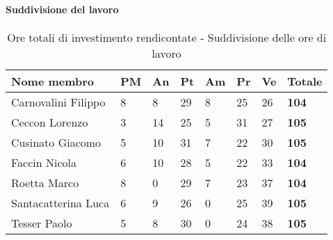 			\paragraph{Suddivisione del lavoro} %
			\label{par:suddivisione_del_lavoro}
				\begin{table}[!ht]
					\begin{center}
						\begin{tabularx}{0.9\textwidth}{|l|l|l|l|l|l|l|X|}
							\hline
							\textbf{Nome membro} & \textbf{PM} & \textbf{An} & \textbf{Pt} & \textbf{Am} & \textbf{Pr} & \textbf{Ve} & \textbf{Totale} \\
							\hline
							Carnovalini Filippo & 8 & 8 & 29 & 8 & 25 & 26 & \textbf{104} \\
							\hline
							Ceccon Lorenzo & 3 & 14 & 25 & 5 & 31 & 27 & \textbf{105} \\
							\hline
							Cusinato Giacomo & 5 & 10 & 31 & 7 & 22 & 30 & \textbf{105} \\
							\hline
							Faccin Nicola & 6 & 10 & 28 & 5 & 22 & 33 & \textbf{104} \\
							\hline
							Roetta Marco & 8 & 0 & 29 & 7 & 23 & 37 & \textbf{104} \\
							\hline
							Santacatterina Luca & 6 & 9 & 26 & 0 & 25 & 39 & \textbf{105} \\
							\hline
							Tesser Paolo & 5 & 8 & 30 & 0 & 24 & 38 & \textbf{105} \\
							\hline	
						\end{tabularx}
					\end{center}
				\caption{Ore totali di investimento rendicontate - Suddivisione delle ore di lavoro}
				\end{table}
				
